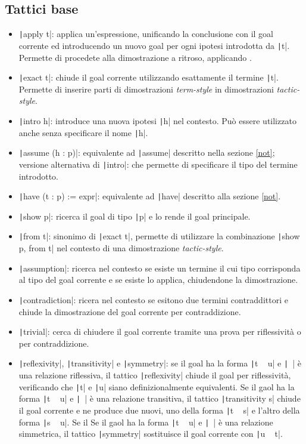 \subsection{Tattici base}
\begin{itemize}%
    \item \texttt|apply t|: applica un'espressione, unificando la conclusione con il goal corrente ed introducendo un nuovo goal per ogni ipotesi introdotta da \texttt|t|. Permette di procedete alla dimostrazione a ritroso, applicando .
    \item \texttt|exact t|: chiude il goal corrente utilizzando esattamente il termine \texttt|t|. Permette di inserire parti di dimostrazioni \emph{term-style} in dimostrazioni \emph{tactic-style}.
    \item \texttt|intro h|: introduce una nuova ipotesi \texttt|h| nel contesto. Può essere utilizzato anche senza specificare il nome \texttt|h|.
    \item \texttt|assume (h : p)|: equivalente ad \texttt|assume| descritto nella sezione \ref{not}; versione alternativa di \texttt|intro|: che permette di specificare il tipo del termine introdotto.
    \item \texttt|have (t : p) := expr|: equivalente ad \texttt|have| descritto alla sezione \ref{not}.
    \item \texttt|show p|: ricerca il goal di tipo \texttt|p| e lo rende il goal principale.
    \item \texttt|from t|: sinonimo di \texttt|exact t|, permette di utilizzare la combinazione \texttt|show p, from t| nel contesto di una dimostrazione \emph{tactic-style}.
    \item \texttt|assumption|: ricerca nel contesto se esiste un termine il cui tipo corrisponda al tipo del goal corrente e se esiste lo applica, chiudendone la dimostrazione.
    \item \texttt|contradiction|: ricera nel contesto se esitono due termini contraddittori e chiude la dimostrazione del goal corrente per contraddizione.
    \item \texttt|trivial|: cerca di chiudere il goal corrente tramite una prova per riflessività o per contraddizione.
    \item \texttt|reflexivity|, \texttt|transitivity| e \texttt|symmetry|: se il goal ha la forma \texttt|t ~ u| e \texttt|~| è una relazione riflessiva, il tattico \texttt|reflexivity| chiude il goal per riflessività, verificando che \texttt|t| e \texttt|u| siano definizionalmente equivalenti. Se il gaol ha la forma \texttt|t ~ u| e \texttt|~| è una relazione transitiva, il tattico \texttt|transitivity s| chiude il goal corrente e ne produce due nuovi, uno della forma \texttt|t ~ s| e l'altro della forma \texttt|s ~ u|. Se il  Se il gaol ha la forma \texttt|t ~ u| e \texttt|~| è una relazione simmetrica, il tattico \texttt|symmetry| sostituisce il goal corrente con \texttt|u ~ t|.

\end{itemize}

